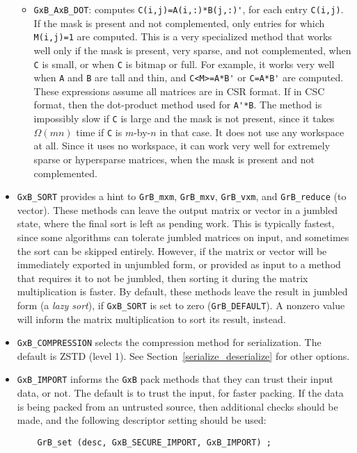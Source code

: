 \documentclass[12pt]{article}
\begin{document}
\begin{itemize}
\begin{itemize}
\item \verb'GxB_AxB_DOT': computes \verb"C(i,j)=A(i,:)*B(j,:)'", for each
    entry \verb'C(i,j)'.  If the mask is present and not complemented, only
    entries for which \verb'M(i,j)=1' are computed.  This is a very specialized
    method that works well only if the mask is present, very sparse, and not
    complemented, when \verb'C' is small, or when \verb'C' is bitmap or full.
    For example, it works very well
    when \verb'A' and \verb'B' are tall and thin, and \verb"C<M>=A*B'" or
    \verb"C=A*B'" are computed.  These expressions assume all matrices are in
    CSR format.  If in CSC format, then the dot-product method used for
    \verb"A'*B".  The method is impossibly slow if \verb'C' is large and the
    mask is not present, since it takes $\Omega(mn)$ time if \verb'C' is
    $m$-by-$n$ in that case.  It does not use any workspace at all.  Since it
    uses no workspace, it can work very well for extremely sparse or
    hypersparse matrices, when the mask is present and not complemented.

    \end{itemize}

\item \verb'GxB_SORT' provides a hint to \verb'GrB_mxm', \verb'GrB_mxv',
    \verb'GrB_vxm', and \verb'GrB_reduce' (to vector).  These methods can leave
    the output matrix or vector in a jumbled state, where the final sort is
    left as pending work.  This is typically fastest, since some algorithms can
    tolerate jumbled matrices on input, and sometimes the sort can be skipped
    entirely.  However, if the matrix or vector will be immediately exported in
    unjumbled form, or provided as input to a method that requires it to not be
    jumbled, then sorting it during the matrix multiplication is faster.
    By default, these methods leave the result in jumbled form (a {\em lazy
    sort}), if \verb'GxB_SORT' is set to zero (\verb'GrB_DEFAULT').  A nonzero
    value will inform the matrix multiplication to sort its result, instead.

\item \verb'GxB_COMPRESSION' selects the compression method for serialization.
    The default is ZSTD (level 1).  See Section~\ref{serialize_deserialize} for
    other options.

\item \verb'GxB_IMPORT' informs the \verb'GxB' pack methods
    that they can trust their input data, or not.  The default is to trust
    the input, for faster packing.  If the data is being packed from an
    untrusted source, then additional checks should be made, and the
    following descriptor setting should be used:

    {\footnotesize
    \begin{verbatim}
    GrB_set (desc, GxB_SECURE_IMPORT, GxB_IMPORT) ; \end{verbatim}}

\end{itemize}
\end{document}
